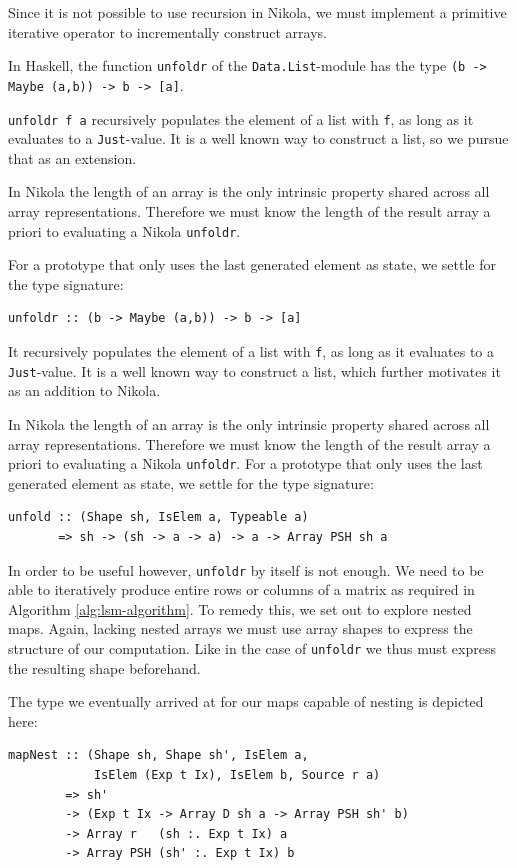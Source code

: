 Since it is not possible to use recursion in Nikola, we must implement a
primitive iterative operator to incrementally construct arrays.

In Haskell, the function \lstinline{unfoldr} of the
\lstinline{Data.List}-module has the type
\lstinline{(b -> Maybe (a,b)) -> b -> [a]}.

\lstinline{unfoldr f a} recursively populates the element of a list with
\lstinline{f}, as long as it evaluates to a \lstinline{Just}-value. It is a well known
way to construct a list, so we pursue that as an extension.

In Nikola the length of an array is the only intrinsic property shared across
all array representations. Therefore we must know the length of the result array a
priori to evaluating a Nikola \lstinline{unfoldr}.

For a prototype that only uses the last generated element as state, we settle
for the type signature:
\begin{lstlisting}
unfoldr :: (b -> Maybe (a,b)) -> b -> [a]
\end{lstlisting}
It recursively populates the element of a list with \lstinline{f}, as
long as it evaluates to a \lstinline{Just}-value. It is a well known
way to construct a list, which further motivates it as an addition to
Nikola.

In Nikola the length of an array is the only intrinsic property shared
across all array representations. Therefore we must know the length of
the result array a priori to evaluating a Nikola
\lstinline{unfoldr}. For a prototype that only uses the last generated
element as state, we settle for the type signature:
\begin{lstlisting}
unfold :: (Shape sh, IsElem a, Typeable a) 
       => sh -> (sh -> a -> a) -> a -> Array PSH sh a
\end{lstlisting}
In order to be useful however, \lstinline{unfoldr} by itself is not
enough. We need to be able to iteratively produce entire rows or
columns of a matrix as required in Algorithm
\ref{alg:lsm-algorithm}. To remedy this, we set out to explore nested
maps. Again, lacking nested arrays we must use array shapes to express
the structure of our computation.  Like in the case of
\lstinline{unfoldr} we thus must express the resulting shape
beforehand.

The type we eventually arrived at for our maps capable of nesting is depicted
here:
\begin{lstlisting}
mapNest :: (Shape sh, Shape sh', IsElem a, 
            IsElem (Exp t Ix), IsElem b, Source r a)
        => sh'
        -> (Exp t Ix -> Array D sh a -> Array PSH sh' b)
        -> Array r   (sh :. Exp t Ix) a
        -> Array PSH (sh' :. Exp t Ix) b
\end{lstlisting}

